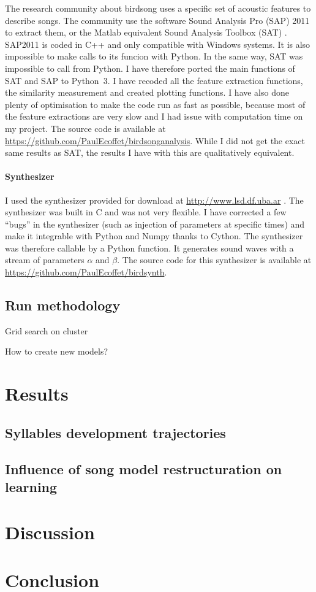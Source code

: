 \documentclass[a4paper]{report}
\begin{document}
The research community about birdsong uses a specific set of acoustic features
to describe songs. The community use the software Sound Analysis Pro (SAP) 2011
to extract them, or the Matlab equivalent Sound Analysis Toolbox (SAT)
\parencite{tchernichovski_procedure_2000}. SAP2011 is coded in C++ and only
compatible with Windows systems. It is also impossible to make calls to its
funcion with Python. In the same way, SAT was impossible to call from Python. I
have therefore ported the main functions of SAT and SAP to Python~3. I have
recoded all the feature extraction functions, the similarity measurement and
created plotting functions. I have also done plenty of optimisation to make the
code run as fast as possible, because most of the feature extractions are very
slow and I had issue with computation time on my project. The source code is
available at \url{https://github.com/PaulEcoffet/birdsonganalysis}. While I did
not get the exact same results as SAT, the results I have with this are
qualitatively equivalent. 

\subsubsection{Synthesizer}

I used the synthesizer provided for download at \url{http://www.lsd.df.uba.ar}
\parencite{boari_automatic_2015}. The synthesizer was built in C and was not
very flexible. I have corrected a few ``bugs'' in the synthesizer (such as
injection of parameters at specific times) and make it integrable with Python
and Numpy thanks to Cython. The synthesizer was therefore callable by a Python
function. It generates sound waves with a stream of parameters $\alpha$ and
$\beta$. The source code for this synthesizer is available at
\url{https://github.com/PaulEcoffet/birdsynth}.

\section{Run methodology}

Grid search on cluster

How to create new models?



\chapter{Results}

\section{Syllables development trajectories}

\section{Influence of song model restructuration on learning}

\chapter{Discussion}

\chapter{Conclusion}

\printbibliography{}
\end{document}
